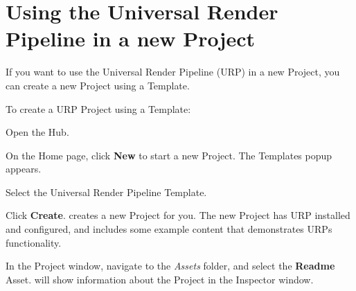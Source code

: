 \chapter{Using the Universal Render Pipeline in a new Project}
\hypertarget{md__hey_tea_9_2_library_2_package_cache_2com_8unity_8render-pipelines_8universal_0d14_80_88_2_do0e54e280482c9e2055dcf6e7a3ab1ea3}{}\label{md__hey_tea_9_2_library_2_package_cache_2com_8unity_8render-pipelines_8universal_0d14_80_88_2_do0e54e280482c9e2055dcf6e7a3ab1ea3}
\label{md__hey_tea_9_2_library_2_package_cache_2com_8unity_8render-pipelines_8universal_0d14_80_88_2_do0e54e280482c9e2055dcf6e7a3ab1ea3_autotoc_md2100}%
%
 

If you want to use the Universal Render Pipeline (URP) in a new Project, you can create a new Project using a Template.

To create a URP Project using a Template\+:


\begin{DoxyEnumerate}
\item Open the  Hub.
\item On the Home page, click {\bfseries{New}} to start a new Project. The Templates popup appears.
\item Select the Universal Render Pipeline Template.
\item Click {\bfseries{Create}}.  creates a new Project for you. The new Project has URP installed and configured, and includes some example content that demonstrates URP\textquotesingle{}s functionality.
\item In the Project window, navigate to the {\itshape Assets} folder, and select the {\bfseries{Readme}} Asset.  will show information about the Project in the Inspector window. 
\end{DoxyEnumerate}